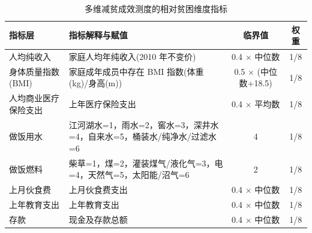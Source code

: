 \begin{table}[H]
\centering
\caption{多维减贫成效测度的相对贫困维度指标}\label{tab:1}
\begin{tabular}[c]{M{2.5cm}|M{6.5cm}|c|c}
  \hline
  指标层 & 指标解释与赋值 & 临界值 & 权重 \\
  \hline
  人均纯收入 & 家庭人均年纯收入(2010 年不变价)& 0.4 $\times$ 中位数 & 1/8 \\
  身体质量指数(BMI) & 家庭成年成员中存在 BMI 指数(体重(kg)/身高(m)) & 0.5 $\times$ (中位数+18.5) & 1/8 \\
  人均商业医疗保险支出 & 上年医疗保险支出 & 0.4 $\times$ 平均数 & 1/8 \\
  做饭用水 & 江河湖水=1，雨水=2，窖水=3，深井水=4，自来水=5，桶装水/纯净水/过滤水=6 & 4 & 1/8 \\
  做饭燃料 & 柴草=1，煤=2，灌装煤气/液化气=3，电=4，天然气=5，太阳能/沼气=6 & 2 & 1/8 \\
  上月伙食费 & 上月伙食费支出 & 0.4 $\times$ 中位数 & 1/8 \\
  上年教育支出 & 上年教育支出 & 0.4 $\times$ 中位数 & 1/8 \\
  存款 & 现金及存款总额 & 0.4 $\times$ 中位数 & 1/8 \\
  \hline
\end{tabular}
\end{table}
